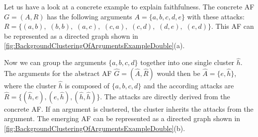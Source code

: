 Let us have a look at a concrete example to explain faithfulness. The concrete AF $G=(A, R)$ has the following arguments $A=\{a, b, c, d, e\}$ with these attacks:
$R=\bigl\{(a,b),$
$(b,b),$
$(a,c),$
$(c,a),$
$(c,d),$
$(d,e),$
$(e,d)\bigl\}$. This AF can be represented as a directed graph shown in \cref{fig:BackgroundClusteringOfArgumentsExampleDouble}(a).

Now we can group the arguments $\{a, b, c, d\}$ together into one single cluster $\hat{h}$. The arguments for the abstract AF $\hat{G}=(\hat{A}, \hat{R})$ would then be $\hat{A}=\{e, \hat{h}\}$, where the cluster $\hat{h}$ is composed of $\{a, b, c, d\}$ and the according attacks are
$\hat{R}=\bigl\{(\hat{h}, e), (e, \hat{h}), (\hat{h}, \hat{h})\bigl\}$. The attacks are directly derived from the concrete AF. If an argument is clustered, the cluster inherits the attacks from the argument. The emerging AF can be represented as a directed graph shown in \cref{fig:BackgroundClusteringOfArgumentsExampleDouble}(b).



